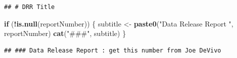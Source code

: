 \documentclass[
]{article}
\newenvironment{Shaded}{\begin{snugshade}}{\end{snugshade}}
\newcommand{\ControlFlowTok}[1]{\textcolor[rgb]{0.13,0.29,0.53}{\textbf{#1}}}
\newcommand{\FunctionTok}[1]{\textcolor[rgb]{0.13,0.29,0.53}{\textbf{#1}}}
\newcommand{\NormalTok}[1]{#1}
\newcommand{\OtherTok}[1]{\textcolor[rgb]{0.56,0.35,0.01}{#1}}
\newcommand{\SpecialCharTok}[1]{\textcolor[rgb]{0.81,0.36,0.00}{\textbf{#1}}}
\newcommand{\StringTok}[1]{\textcolor[rgb]{0.31,0.60,0.02}{#1}}
\begin{document}
\begin{verbatim}
## # DRR Title
\end{verbatim}

\begin{Shaded}
\begin{Highlighting}[]
\ControlFlowTok{if}\NormalTok{ (}\SpecialCharTok{!}\FunctionTok{is.null}\NormalTok{(reportNumber)) \{}
\NormalTok{  subtitle }\OtherTok{\textless{}{-}} \FunctionTok{paste0}\NormalTok{(}\StringTok{"Data Release Report "}\NormalTok{, reportNumber)}
  \FunctionTok{cat}\NormalTok{(}\StringTok{"\#\#\#"}\NormalTok{, subtitle)}
\NormalTok{\}}
\end{Highlighting}
\end{Shaded}

\begin{verbatim}
## ### Data Release Report : get this number from Joe DeVivo
\end{verbatim}
\end{document}
